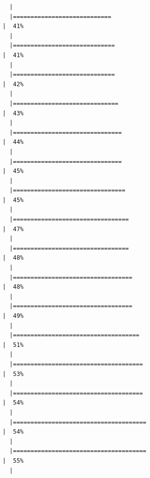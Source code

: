 \documentclass[
  letterpaper,
  DIV=11,
  numbers=noendperiod]{scrreprt}
\begin{document}
\begin{verbatim}
  |                                                                            
  |============================                                          |  41%
  |                                                                            
  |=============================                                         |  41%
  |                                                                            
  |=============================                                         |  42%
  |                                                                            
  |==============================                                        |  43%
  |                                                                            
  |===============================                                       |  44%
  |                                                                            
  |===============================                                       |  45%
  |                                                                            
  |================================                                      |  45%
  |                                                                            
  |=================================                                     |  47%
  |                                                                            
  |=================================                                     |  48%
  |                                                                            
  |==================================                                    |  48%
  |                                                                            
  |==================================                                    |  49%
  |                                                                            
  |====================================                                  |  51%
  |                                                                            
  |=====================================                                 |  53%
  |                                                                            
  |=====================================                                 |  54%
  |                                                                            
  |======================================                                |  54%
  |                                                                            
  |======================================                                |  55%
  |                                                                            

\end{verbatim}
\end{document}
